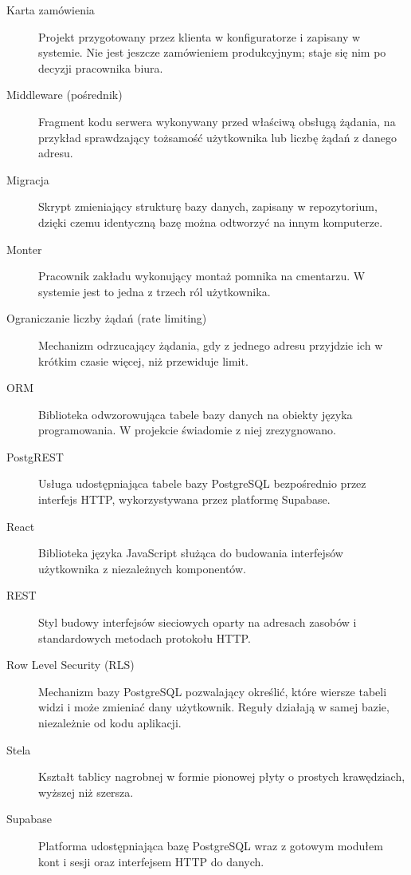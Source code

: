 \begin{description}
\item[Karta zamówienia] Projekt przygotowany przez klienta w konfiguratorze i zapisany w systemie. Nie jest jeszcze zamówieniem produkcyjnym; staje się nim po decyzji pracownika biura.

\item[Middleware (pośrednik)] Fragment kodu serwera wykonywany przed właściwą obsługą żądania, na przykład sprawdzający tożsamość użytkownika lub liczbę żądań z danego adresu.

\item[Migracja] Skrypt zmieniający strukturę bazy danych, zapisany w repozytorium, dzięki czemu identyczną bazę można odtworzyć na innym komputerze.

\item[Monter] Pracownik zakładu wykonujący montaż pomnika na cmentarzu. W systemie jest to jedna z trzech ról użytkownika.

\item[Ograniczanie liczby żądań (rate limiting)] Mechanizm odrzucający żądania, gdy z jednego adresu przyjdzie ich w krótkim czasie więcej, niż przewiduje limit.

\item[ORM] Biblioteka odwzorowująca tabele bazy danych na obiekty języka programowania. W projekcie świadomie z niej zrezygnowano.

\item[PostgREST] Usługa udostępniająca tabele bazy PostgreSQL bezpośrednio przez interfejs HTTP, wykorzystywana przez platformę Supabase.

\item[React] Biblioteka języka JavaScript służąca do budowania interfejsów użytkownika z niezależnych komponentów.

\item[REST] Styl budowy interfejsów sieciowych oparty na adresach zasobów i standardowych metodach protokołu HTTP.

\item[Row Level Security (RLS)] Mechanizm bazy PostgreSQL pozwalający określić, które wiersze tabeli widzi i może zmieniać dany użytkownik. Reguły działają w samej bazie, niezależnie od kodu aplikacji.

\item[Stela] Kształt tablicy nagrobnej w formie pionowej płyty o prostych krawędziach, wyższej niż szersza.

\item[Supabase] Platforma udostępniająca bazę PostgreSQL wraz z gotowym modułem kont i sesji oraz interfejsem HTTP do danych.


\end{description}
